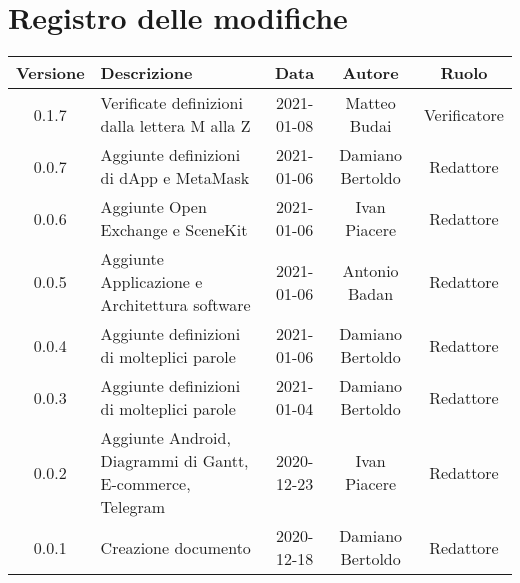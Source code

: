\section*{Registro delle modifiche}

\begin{center}
	\begin{longtable}{|c|p{5cm}|c|c|c|}
	\hline
	\rowcolor{lighter-grayer}
	\textbf{Versione} & \textbf{Descrizione} & \textbf{Data} & \textbf{Autore} & \textbf{Ruolo} \\
	\hline
	\endfirsthead

	0.1.7 & Verificate definizioni dalla lettera M alla Z & 2021-01-08 & Matteo Budai & Verificatore \\
	\hline
	0.0.7 & Aggiunte definizioni di dApp e MetaMask & 2021-01-06 & Damiano Bertoldo & Redattore \\
	\hline
	0.0.6 & Aggiunte Open Exchange e SceneKit & 2021-01-06 & Ivan Piacere & Redattore \\
	\hline
	0.0.5 & Aggiunte Applicazione e Architettura software & 2021-01-06 & Antonio Badan & Redattore \\
	\hline
	0.0.4 & Aggiunte definizioni di molteplici parole & 2021-01-06 & Damiano Bertoldo & Redattore \\
	\hline
	0.0.3 & Aggiunte definizioni di molteplici parole & 2021-01-04 & Damiano Bertoldo & Redattore \\
	\hline
	0.0.2 & Aggiunte Android, Diagrammi di Gantt, E-commerce, Telegram & 2020-12-23 & Ivan Piacere & Redattore \\
	\hline
	0.0.1 & Creazione documento & 2020-12-18 & Damiano Bertoldo & Redattore \\
	\hline

	\end{longtable}
\end{center}